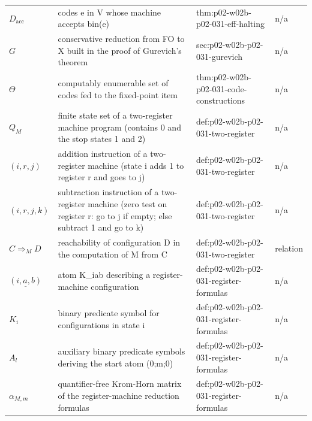 \begin{longtable}{@{}p{}p{}p{}p{}@{}}
\(D_{\mathrm{acc}}\) & codes e in V whose machine accepts bin(e) & thm:\allowbreak{}p02-\allowbreak{}w02b-\allowbreak{}p02-\allowbreak{}031-\allowbreak{}eff-\allowbreak{}halting & n/a \\
\(G\) & conservative reduction from FO to X built in the proof of Gurevich's theorem & sec:\allowbreak{}p02-\allowbreak{}w02b-\allowbreak{}p02-\allowbreak{}031-\allowbreak{}gurevich & n/a \\
\(\Theta\) & computably enumerable set of codes fed to the fixed-point item & thm:\allowbreak{}p02-\allowbreak{}w02b-\allowbreak{}p02-\allowbreak{}031-\allowbreak{}code-\allowbreak{}constructions & n/a \\
\(Q_M\) & finite state set of a two-register machine program (contains 0 and the stop states 1 and 2) & def:\allowbreak{}p02-\allowbreak{}w02b-\allowbreak{}p02-\allowbreak{}031-\allowbreak{}two-\allowbreak{}register & n/a \\
\((i,\allowbreak r,\allowbreak j)\) & addition instruction of a two-register machine (state i adds 1 to register r and goes to j) & def:\allowbreak{}p02-\allowbreak{}w02b-\allowbreak{}p02-\allowbreak{}031-\allowbreak{}two-\allowbreak{}register & n/a \\
\((i,\allowbreak r,\allowbreak j,\allowbreak k)\) & subtraction instruction of a two-register machine (zero test on register r: go to j if empty; else subtract 1 and go to k) & def:\allowbreak{}p02-\allowbreak{}w02b-\allowbreak{}p02-\allowbreak{}031-\allowbreak{}two-\allowbreak{}register & n/a \\
\(C\Rightarrow_M D\) & reachability of configuration D in the computation of M from C & def:\allowbreak{}p02-\allowbreak{}w02b-\allowbreak{}p02-\allowbreak{}031-\allowbreak{}two-\allowbreak{}register & relation \\
\(\underline{(i,a,b)}\) & atom K\_iab describing a register-machine configuration & def:\allowbreak{}p02-\allowbreak{}w02b-\allowbreak{}p02-\allowbreak{}031-\allowbreak{}register-\allowbreak{}formulas & n/a \\
\(K_i\) & binary predicate symbol for configurations in state i & def:\allowbreak{}p02-\allowbreak{}w02b-\allowbreak{}p02-\allowbreak{}031-\allowbreak{}register-\allowbreak{}formulas & n/a \\
\(A_l\) & auxiliary binary predicate symbols deriving the start atom (0;m;0) & def:\allowbreak{}p02-\allowbreak{}w02b-\allowbreak{}p02-\allowbreak{}031-\allowbreak{}register-\allowbreak{}formulas & n/a \\
\(\alpha_{M,m}\) & quantifier-free Krom-Horn matrix of the register-machine reduction formulas & def:\allowbreak{}p02-\allowbreak{}w02b-\allowbreak{}p02-\allowbreak{}031-\allowbreak{}register-\allowbreak{}formulas & n/a \\

\end{longtable}
